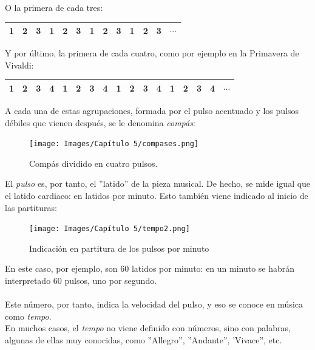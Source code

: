 \documentclass[a4paper, openright, 11pt, titlepage]{report}
\theoremstyle{definition}\newtheorem{defin}[propo]{Definition}
\theoremstyle{definition}\newtheorem{obser}[propo]{Remark}
\theoremstyle{definition}\newtheorem{ejem}[propo]{Ejemplo}
\theoremstyle{definition}\newtheorem{algoritmo}[propo]{Algoritmo}
\begin{document}
O la primera de cada tres:
\begin{table}[H]
    \centering
    \begin{tabular}{|c|c|c|c|c|c|c|c|c|c|c|c|c|}
    \hline
        \cellcolor{acento}1 & 2 & 3 & \cellcolor{acento}1 & 2 & 3 & \cellcolor{acento}1 & 2 & 3 & \cellcolor{acento}1 & 2 & 3 & $\cdots$ \\
    \hline
    \end{tabular}
\end{table}
Y por último, la primera de cada cuatro, como por ejemplo en la Primavera de Vivaldi:
\begin{table}[H]
    \centering
    \begin{tabular}{|c|c|c|c|c|c|c|c|c|c|c|c|c|c|c|c|c|}
    \hline
        \cellcolor{acento}1 & 2 & 3 & 4 & \cellcolor{acento}1 & 2 & 3 & 4 & \cellcolor{acento}1 & 2 & 3 & 4 & \cellcolor{acento}1 & 2 & 3 & 4 & $\cdots$ \\
    \hline
    \end{tabular}
\end{table}
A cada una de estas agrupaciones, formada por el pulso acentuado y los pulsos débiles que vienen después, se le denomina \textit{compás}:
\begin{figure}[H]
    \centering
    \texttt{[image: Images/Capítulo 5/compases.png]}
    \caption{Compás dividido en cuatro pulsos.}
\end{figure}
El \textit{pulso} es, por tanto, el ''latido'' de la pieza musical. De hecho, se mide igual que el latido cardiaco: en latidos por minuto. Esto también viene indicado al inicio de las partituras:
\begin{figure}[H]
    \centering
    \texttt{[image: Images/Capítulo 5/tempo2.png]}
    \caption{Indicación en partitura de los pulsos por minuto}
\end{figure}
En este caso, por ejemplo, son 60 latidos por minuto: en un minuto se habrán interpretado 60 pulsos, uno por segundo.\\\\
Este número, por tanto, indica la velocidad del pulso, y eso se conoce en música como \textit{tempo}.\\ En muchos casos, el \textit{tempo} no viene definido con números, sino con palabras, algunas de ellas muy conocidas, como ''Allegro'', ''Andante'', 'Vivace'', etc.
\end{document}
